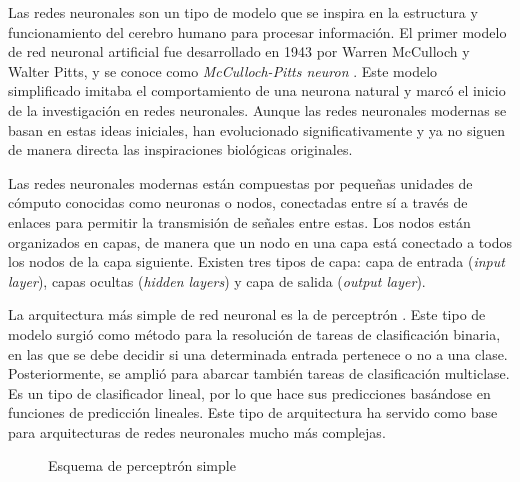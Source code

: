 \documentclass[11pt,spanish,listoffigures,listoftables]{tfgetsinf}
\begin{document}
Las redes neuronales son un tipo de modelo que se inspira en la estructura y funcionamiento del cerebro humano para procesar información. El primer modelo de red neuronal artificial fue desarrollado en 1943 por Warren McCulloch y Walter Pitts, y se conoce como \textit{McCulloch-Pitts neuron} \cite{mcculloch1943logical}. Este modelo simplificado imitaba el comportamiento de una neurona natural y marcó el inicio de la investigación en redes neuronales. Aunque las redes neuronales modernas se basan en estas ideas iniciales, han evolucionado significativamente y ya no siguen de manera directa las inspiraciones biológicas originales.

Las redes neuronales modernas están compuestas por pequeñas unidades de cómputo conocidas como neuronas o nodos, conectadas entre sí a través de enlaces para permitir la transmisión de señales entre estas. Los nodos están organizados en capas, de manera que un nodo en una capa está conectado a todos los nodos de la capa siguiente. Existen tres tipos de capa: capa de entrada (\textit{input layer}), capas ocultas (\textit{hidden layers}) y capa de salida (\textit{output layer}). 

La arquitectura más simple de red neuronal es la de perceptrón \cite{RevModPhys.34.123}. Este tipo de modelo surgió como método para la resolución de tareas de clasificación binaria, en las que se debe decidir si una determinada entrada pertenece o no a una clase. Posteriormente, se amplió para abarcar también tareas de clasificación multiclase. Es un tipo de clasificador lineal, por lo que hace sus predicciones basándose en funciones de predicción lineales. Este tipo de arquitectura ha servido como base para arquitecturas de redes neuronales mucho más complejas.

\begin{figure}[h]
	\centering
	\caption{Esquema de perceptrón simple}
	\label{fig:perceptronSimple}	
\end{figure}
\end{document}
